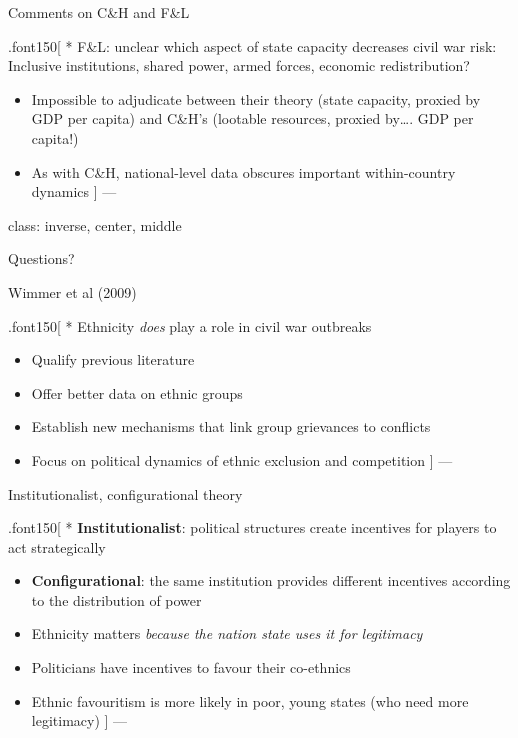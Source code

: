 \documentclass[ignorenonframetext,]{beamer}
\begin{document}
\begin{frame}{Comments on C\&H and F\&L}

.font150{[} * F\&L: unclear which aspect of state capacity decreases
civil war risk: Inclusive institutions, shared power, armed forces,
economic redistribution?

\begin{itemize}
\item
  Impossible to adjudicate between their theory (state capacity, proxied
  by GDP per capita) and C\&H's (lootable resources, proxied by\ldots{}.
  GDP per capita!)
\item
  As with C\&H, national-level data obscures important within-country
  dynamics {]} ---
\end{itemize}

class: inverse, center, middle

\end{frame}

\begin{frame}{Questions?}

\end{frame}

\begin{frame}{Wimmer et al (2009)}

.font150{[} * Ethnicity \emph{does} play a role in civil war outbreaks

\begin{itemize}
\item
  Qualify previous literature
\item
  Offer better data on ethnic groups
\item
  Establish new mechanisms that link group grievances to conflicts
\item
  Focus on political dynamics of ethnic exclusion and competition {]}
  ---
\end{itemize}

\end{frame}

\begin{frame}{Institutionalist, configurational theory}

.font150{[} * \textbf{Institutionalist}: political structures create
incentives for players to act strategically

\begin{itemize}
\item
  \textbf{Configurational}: the same institution provides different
  incentives according to the distribution of power
\item
  Ethnicity matters \emph{because the nation state uses it for
  legitimacy}
\item
  Politicians have incentives to favour their co-ethnics
\item
  Ethnic favouritism is more likely in poor, young states (who need more
  legitimacy) {]} ---
\end{itemize}

\end{frame}
\end{document}
